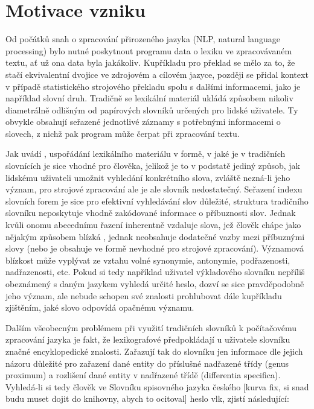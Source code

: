 \documentclass[a4paper, 11pt, oneside]{book}
\newcommand\ex{\textsf}
\begin{document}
			\section{Motivace vzniku}
				Od počátků snah o zpracování přirozeného jazyka (NLP, natural language processing) bylo nutné poskytnout programu data o lexiku ve zpracovávaném textu, ať už ona data byla jakákoliv. Kupříkladu pro překlad se mělo za to, že stačí ekvivalentní dvojice ve zdrojovém a cílovém jazyce, později se přidal kontext v případě statistického strojového překladu spolu s dalšími informacemi, jako je například slovní druh. Tradičně se lexikální materiál ukládá způsobem nikoliv diametrálně odlišným od papírových slovníků určených pro lidské uživatele. Ty obvykle obsahují seřazené jednotlivé záznamy s potřebnými informacemi o slovech, z nichž pak program může čerpat při zpracování textu.

				Jak uvádí \textcite{pala2013vceska}, uspořádání lexikálního materiálu v formě, v jaké je v tradičních slovnících je sice vhodné pro člověka, jelikož je to v podstatě jediný způsob, jak lidskému uživateli umožnit vyhledání konkrétního slova, zvláště nezná-li jeho význam, pro strojové zpracování ale je ale slovník nedostatečný. Seřazení indexu slovních forem je sice pro efektivní vyhledávání slov důležité, struktura tradičního slovníku neposkytuje vhodně zakódované informace o příbuznosti slov. Jednak kvůli onomu abecednímu řazení inherentně vzdaluje slova, jež člověk chápe jako nějakým způsobem blízká \parencite{pala2013vceska}, jednak neobsahuje dodatečné vazby mezi příbuznými slovy (nebo je obsahuje ve formě nevhodné pro strojové zpracování). Významová blízkost může vyplývat ze vztahu volné synonymie, antonymie, podřazenosti, nadřazenosti, etc. Pokud si tedy například uživatel výkladového slovníku nepříliš obeznámený s daným jazykem vyhledá určité heslo, dozví se sice pravděpodobně jeho význam, ale nebude schopen své znalosti prohlubovat dále kupříkladu zjištěním, jaké slovo odpovídá opačnému významu.

				Dalším všeobecným problémem při využití tradičních slovníků k počítačovému zpracování jazyka je fakt, že lexikografové předpokládají u uživatele slovníku značné encyklopedické znalosti. Zařazují tak do slovníku jen informace dle jejich názoru důležité pro zařazení dané entity do příslušné nadřazené třídy (genus proximum) a rozlišení dané entity v nadřazené třídě (differentia specifica). Vyhledá-li si tedy člověk ve Slovníku spisovného jazyka českého [kurva fix, si snad budu muset dojit do knihovny, abych to ocitoval] heslo \ex{vlk}, zjistí následující:
\end{document}
